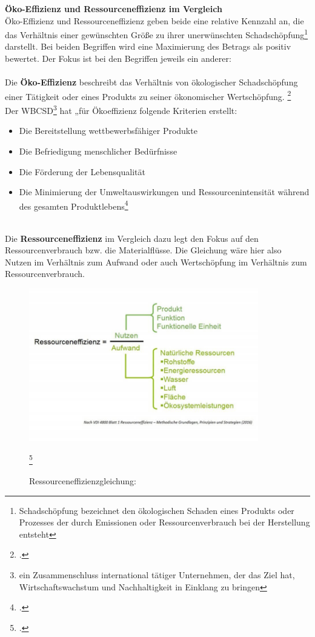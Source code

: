 \documentclass{scrartcl}
\begin{document}
\textbf{Öko-Effizienz und Ressourceneffizienz im Vergleich}\\
Öko-Effizienz und Ressourceneffizienz geben beide eine relative Kennzahl an, die das Verhältnis einer gewünschten Größe zu ihrer unerwünschten Schadschöpfung\footnote{Schadschöpfung bezeichnet den ökologischen Schaden eines Produkts oder Prozesses der durch Emissionen oder Ressourcenverbrauch bei der Herstellung entsteht} darstellt. Bei beiden Begriffen wird eine  Maximierung des Betrags als positiv bewertet. Der Fokus ist bei den Begriffen jeweils ein anderer: 
\\
\\
Die \textbf{Öko-Effizienz} beschreibt das Verhältnis von ökologischer Schadschöpfung einer Tätigkeit oder eines Produkts zu seiner ökonomischer Wertschöpfung. \footcite[Vgl.][S.]{Schaltegger1990OkologischeUnternehmung} 
\\
 Der WBCSD\footnote{ein Zusammenschluss international tätiger Unternehmen, der das Ziel hat, Wirtschaftswachstum und Nachhaltigkeit in Einklang zu bringen} hat „für Ökoeffizienz folgende Kriterien erstellt: 
 \begin{itemize}
 \item Die Bereitstellung wettbewerbsfähiger Produkte
 \item Die Befriedigung menschlicher Bedürfnisse 
 \item Die Förderung der Lebensqualität
 \item Die Minimierung der Umweltauswirkungen und Ressourcenintensität während des gesamten Produktlebens\footcite{OkoeffizienzBrockhaus.de}
 \end{itemize}
\\
Die \textbf{Ressourceneffizienz} im Vergleich dazu legt den Fokus auf den Ressourcenverbrauch bzw. die Materialflüsse. Die Gleichung wäre hier also Nutzen im Verhältnis zum Aufwand oder auch Wertschöpfung im Verhältnis zum Ressourcenverbrauch.
\begin{figure}[htbp]
\centering
\includegraphics[width=10cm]{image_folder/ressourceneffizienz.jpg}
\caption{Ressourceneffizienzgleichung:}
\label{fig:Ressourceneffizienzgleichung}\footcite{Essel2010AnalyseFazit}
\end{figure}
\end{document}
